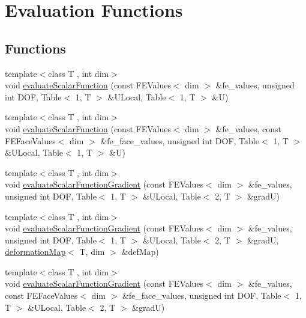 \section{Evaluation Functions}
\label{group___evaluation_functions}
\subsection*{Functions}
\begin{DoxyCompactItemize}
\item 
{\footnotesize template$<$class T , int dim$>$ }\\void \hyperlink{group___evaluation_functions_ga399ae2353249293211c021848a64175c}{evaluate\-Scalar\-Function} (const F\-E\-Values$<$ dim $>$ \&fe\-\_\-values, unsigned int D\-O\-F, Table$<$ 1, T $>$ \&U\-Local, Table$<$ 1, T $>$ \&U)
\item 
{\footnotesize template$<$class T , int dim$>$ }\\void \hyperlink{group___evaluation_functions_ga2e2fbeb2173113c6889c73bbb7304789}{evaluate\-Scalar\-Function} (const F\-E\-Values$<$ dim $>$ \&fe\-\_\-values, const F\-E\-Face\-Values$<$ dim $>$ \&fe\-\_\-face\-\_\-values, unsigned int D\-O\-F, Table$<$ 1, T $>$ \&U\-Local, Table$<$ 1, T $>$ \&U)
\item 
{\footnotesize template$<$class T , int dim$>$ }\\void \hyperlink{group___evaluation_functions_ga3ee6127c2c5c8333bb7fb384dcdb431f}{evaluate\-Scalar\-Function\-Gradient} (const F\-E\-Values$<$ dim $>$ \&fe\-\_\-values, unsigned int D\-O\-F, Table$<$ 1, T $>$ \&U\-Local, Table$<$ 2, T $>$ \&grad\-U)
\item 
{\footnotesize template$<$class T , int dim$>$ }\\void \hyperlink{group___evaluation_functions_gabeb71201e8213a7c7616cd8824617f73}{evaluate\-Scalar\-Function\-Gradient} (const F\-E\-Values$<$ dim $>$ \&fe\-\_\-values, unsigned int D\-O\-F, Table$<$ 1, T $>$ \&U\-Local, Table$<$ 2, T $>$ \&grad\-U, \hyperlink{structdeformation_map}{deformation\-Map}$<$ T, dim $>$ \&def\-Map)
\item 
{\footnotesize template$<$class T , int dim$>$ }\\void \hyperlink{group___evaluation_functions_ga4622566d0fe19b017cf8d2643ffeb47a}{evaluate\-Scalar\-Function\-Gradient} (const F\-E\-Values$<$ dim $>$ \&fe\-\_\-values, const F\-E\-Face\-Values$<$ dim $>$ \&fe\-\_\-face\-\_\-values, unsigned int D\-O\-F, Table$<$ 1, T $>$ \&U\-Local, Table$<$ 2, T $>$ \&grad\-U)

\end{DoxyCompactItemize}
